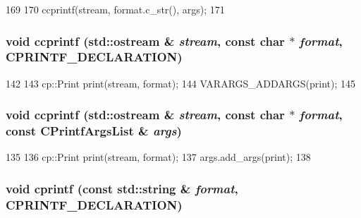 \begin{DoxyCode}
169 {
170     ccprintf(stream, format.c_str(), args);
171 }
\end{DoxyCode}
\hypertarget{cprintf_8hh_a871a2a413880546a700749cb06b2e6a0}{
\subsubsection[{ccprintf}]{\setlength{\rightskip}{0pt plus 5cm}void ccprintf (std::ostream \& {\em stream}, \/  const char $\ast$ {\em format}, \/  CPRINTF\_\-DECLARATION)}}
\label{cprintf_8hh_a871a2a413880546a700749cb06b2e6a0}



\begin{DoxyCode}
142 {
143     cp::Print print(stream, format);
144     VARARGS_ADDARGS(print);
145 }
\end{DoxyCode}
\hypertarget{cprintf_8hh_ab172c0b086575bda3d04daee7df17da1}{
\subsubsection[{ccprintf}]{\setlength{\rightskip}{0pt plus 5cm}void ccprintf (std::ostream \& {\em stream}, \/  const char $\ast$ {\em format}, \/  const {\bf CPrintfArgsList} \& {\em args})}}
\label{cprintf_8hh_ab172c0b086575bda3d04daee7df17da1}



\begin{DoxyCode}
135 {
136     cp::Print print(stream, format);
137     args.add_args(print);
138 }
\end{DoxyCode}
\hypertarget{cprintf_8hh_a28e451c18b1dfb9bbfc3669c70adf3c6}{
\subsubsection[{cprintf}]{\setlength{\rightskip}{0pt plus 5cm}void cprintf (const std::string \& {\em format}, \/  CPRINTF\_\-DECLARATION)}}
\label{cprintf_8hh_a28e451c18b1dfb9bbfc3669c70adf3c6}




